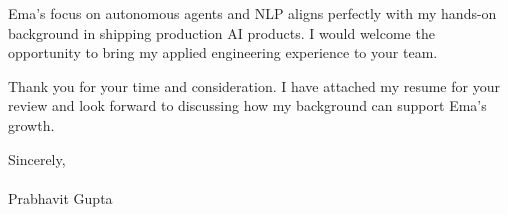 \documentclass[11pt,a4paper]{article}
\begin{document}
\vspace{1em}
\noindent Ema's focus on autonomous agents and NLP aligns perfectly with my hands-on background in shipping production AI products. I would welcome the opportunity to bring my applied engineering experience to your team.

\vspace{1em}
\noindent Thank you for your time and consideration. I have attached my resume for your review and look forward to discussing how my background can support Ema's growth.

\vspace{2em}
\noindent Sincerely, \\
\vspace{1em} \\
\noindent Prabhavit Gupta
\end{document}
